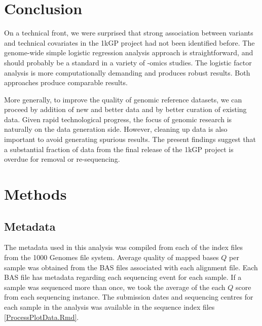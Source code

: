 \documentclass[custompaper]{MBE}%
\begin{document}
\section{Conclusion}

On a technical front, we were surprised that strong association between variants and technical covariates in the 1kGP project had not been identified before. 
The genome-wide simple logistic regression analysis approach is straightforward, and should probably be a standard in a variety of -omics studies. The logistic factor analysis is more computationally demanding and produces robust results. Both approaches produce comparable results.  

More generally, to improve the quality of genomic reference datasets, we can proceed by addition of new and better data and by better curation of existing data.
Given rapid technological progress, the focus of genomic research is naturally on the data generation side. 
However, cleaning up data is also important to avoid generating spurious results. 
The present findings suggest that a substantial fraction of data from the final release of the 1kGP project is overdue for removal or re-sequencing.


\newpage{}
\section{Methods}
\subsection{Metadata}
The metadata used in this analysis was compiled from each of the index files from the 1000 Genomes file system. 
Average quality of mapped bases $Q$ per sample was obtained from the BAS files associated with each alignment file. 
Each BAS file has metadata regarding each sequencing event for each sample. 
If a sample was sequenced more than once, we took the average of the each $Q$ score from each sequencing instance. 
The submission dates and sequencing centres for each sample in the analysis was available in the sequence index files \ref{ProcessPlotData.Rmd}.
\end{document}
